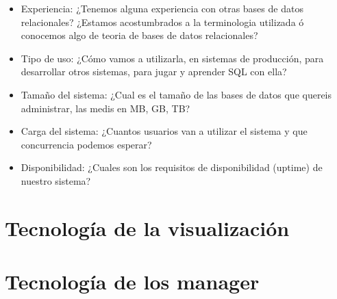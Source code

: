 \documentclass[a4paper,12pt]{article}
\begin{document}
\begin{itemize}
\item Experiencia: ¿Tenemos alguna experiencia con otras bases de datos relacionales? ¿Estamos acostumbrados a la terminologia utilizada ó conocemos algo de teoria de bases de datos relacionales?
\item Tipo de uso: ¿Cómo vamos a utilizarla, en sistemas de producción, para desarrollar otros sistemas, para jugar y aprender SQL con ella?
\item Tamaño del sistema: ¿Cual es el tamaño de las bases de datos que quereis administrar, las medis en MB, GB, TB?
\item Carga del sistema: ¿Cuantos usuarios van a utilizar el sistema y que concurrencia podemos esperar?
\item Disponibilidad: ¿Cuales son los requisitos de disponibilidad (uptime) de nuestro sistema?
\end{itemize}

\section{Tecnología de la visualización}

\section{Tecnología de los manager}
\end{document}
